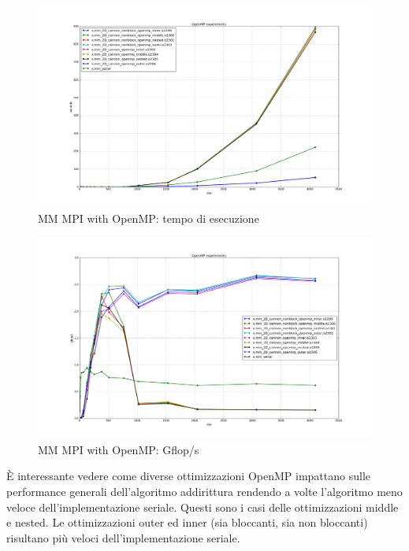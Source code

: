 \begin{figure}[htbp]
    \begin{center}
        \includegraphics[width=15cm]{immagini/openmp_times.png}
    \end{center}
    \caption{MM MPI with OpenMP: tempo di esecuzione}
    \label{fig:openmp_times}
\end{figure}

\begin{figure}[htbp]
    \begin{center}
        \includegraphics[width=15cm]{immagini/openmp_gflops.png}
    \end{center}
    \caption{MM MPI with OpenMP: Gflop/s}
    \label{fig:openmp_gflops}
\end{figure}

\`{E} interessante vedere come diverse ottimizzazioni OpenMP impattano sulle performance generali dell'algoritmo addirittura rendendo a volte l'algoritmo meno veloce dell'implementazione seriale. Questi sono i casi delle ottimizzazioni middle e nested.
Le ottimizzazioni outer ed inner (sia bloccanti, sia non bloccanti) risultano pi\`{u} veloci dell'implementazione seriale.

